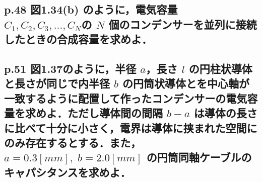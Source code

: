 \documentclass[a4paper, 12pt]{bxjsarticle}
\begin{document}
\subsection{p.48 図1.34(b) のように，電気容量 \(C_1,C_2,C_3,\ldots,C_N\)の \(N\) 個のコンデンサーを並列に接続したときの合成容量を求めよ．}

\newpage
\subsection{p.51 図1.37のように，半径 \(a\)，長さ \(l\) の円柱状導体と長さが同じで内半径 \(b\) の円筒状導体とを中心軸が一致するように配置して作ったコンデンサーの電気容量を求めよ．ただし導体間の間隔 \(b-a\) は導体の長さに比べて十分に小さく，電界は導体に挟まれた空間にのみ存在するとする．また，\(a=0.3\si{[mm]},\;b=2.0\si{[mm]}\) の円筒同軸ケーブルのキャパシタンスを求めよ．}
\end{document}
